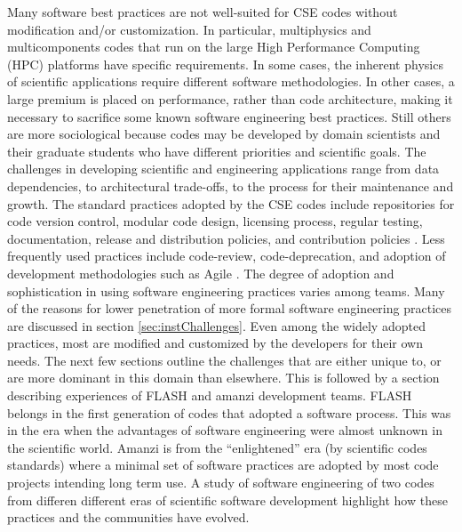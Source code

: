 Many software best practices are not well-suited for CSE codes without
modification and/or customization.  In particular, multiphysics and
multicomponents codes that run on the large High Performance Computing
(HPC) platforms have specific requirements.  In some cases, the
inherent physics of scientific applications require different software
methodologies.  In other cases, a large premium is placed on
performance, rather than code architecture, making it necessary to
sacrifice some known software engineering best practices.  Still
others are more sociological because codes may be developed by domain
scientists and their graduate students who have different priorities
and scientific goals.  
The challenges in developing scientific and engineering applications range
from data dependencies, to architectural trade-offs, to the process for their maintenance and
growth. 
The standard practices adopted by the CSE codes include
repositories for code version control, modular code design, licensing
process, regular testing, documentation, release and distribution
policies, and contribution policies \cite{cc2012, carver2012software,
Dubey2014}. Less frequently used practices include code-review,
code-deprecation, and adoption of development methodologies such as
Agile \cite{agile}.  
The degree of adoption and sophistication in using software
engineering practices varies among teams. Many of the reasons for
lower penetration of more formal software engineering practices are
discussed in section \ref{sec:instChallenges}. Even among the widely
adopted practices, most are modified and customized by the developers
for their own needs. The next few sections outline the challenges that  
are either unique to, or are more dominant in this domain than
elsewhere. This is followed by a section describing experiences of
FLASH and amanzi development teams. FLASH belongs in the first generation of
codes that adopted a software process. This was in the era when the
advantages of software engineering were almost unknown in the
scientific world. Amanzi is from the ``enlightened'' era (by
scientific codes standards) where a minimal set of software practices are
adopted by most code projects intending long term use. A study of
software engineering of two codes from differen different
eras of scientific software development highlight how these practices
and the communities have evolved.   



